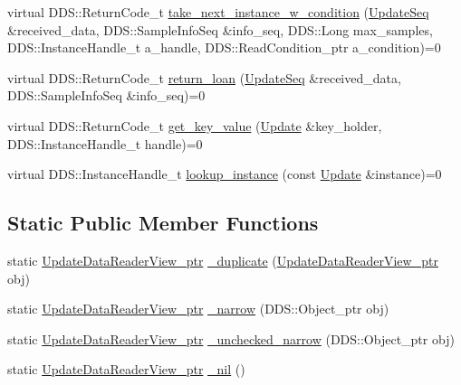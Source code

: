 \begin{DoxyCompactItemize}
\item 
virtual DDS::ReturnCode\_\-t \hyperlink{classKnowledge_1_1UpdateDataReaderView_a32ed3ea4770380d8c80dc3c50b62f12c}{take\_\-next\_\-instance\_\-w\_\-condition} (\hyperlink{namespaceKnowledge_ab62e46316b954f0d249e0e45de7059dc}{UpdateSeq} \&received\_\-data, DDS::SampleInfoSeq \&info\_\-seq, DDS::Long max\_\-samples, DDS::InstanceHandle\_\-t a\_\-handle, DDS::ReadCondition\_\-ptr a\_\-condition)=0
\item 
virtual DDS::ReturnCode\_\-t \hyperlink{classKnowledge_1_1UpdateDataReaderView_a1b79441f3f23a20281762c217f1a9c41}{return\_\-loan} (\hyperlink{namespaceKnowledge_ab62e46316b954f0d249e0e45de7059dc}{UpdateSeq} \&received\_\-data, DDS::SampleInfoSeq \&info\_\-seq)=0
\item 
virtual DDS::ReturnCode\_\-t \hyperlink{classKnowledge_1_1UpdateDataReaderView_ad573a746c07295f3e9eb197ccecdd00f}{get\_\-key\_\-value} (\hyperlink{structKnowledge_1_1Update}{Update} \&key\_\-holder, DDS::InstanceHandle\_\-t handle)=0
\item 
virtual DDS::InstanceHandle\_\-t \hyperlink{classKnowledge_1_1UpdateDataReaderView_a0d762f6d1afe7b31bcf87b51a8a9e28c}{lookup\_\-instance} (const \hyperlink{structKnowledge_1_1Update}{Update} \&instance)=0
\end{DoxyCompactItemize}
\subsection*{Static Public Member Functions}
\begin{DoxyCompactItemize}
\item 
static \hyperlink{classKnowledge_1_1UpdateDataReaderView}{UpdateDataReaderView\_\-ptr} \hyperlink{classKnowledge_1_1UpdateDataReaderView_a6f26fa05470b2a66383cbb6e370a3ce1}{\_\-duplicate} (\hyperlink{classKnowledge_1_1UpdateDataReaderView}{UpdateDataReaderView\_\-ptr} obj)
\item 
static \hyperlink{classKnowledge_1_1UpdateDataReaderView}{UpdateDataReaderView\_\-ptr} \hyperlink{classKnowledge_1_1UpdateDataReaderView_a688f499c752d862cf3e3f4d62ea805cf}{\_\-narrow} (DDS::Object\_\-ptr obj)
\item 
static \hyperlink{classKnowledge_1_1UpdateDataReaderView}{UpdateDataReaderView\_\-ptr} \hyperlink{classKnowledge_1_1UpdateDataReaderView_af375e21f40dfc412c8d718cafc2b8d50}{\_\-unchecked\_\-narrow} (DDS::Object\_\-ptr obj)
\item 
static \hyperlink{classKnowledge_1_1UpdateDataReaderView}{UpdateDataReaderView\_\-ptr} \hyperlink{classKnowledge_1_1UpdateDataReaderView_aa423125ab5a10c81941866dae69efadc}{\_\-nil} ()
\end{DoxyCompactItemize}
